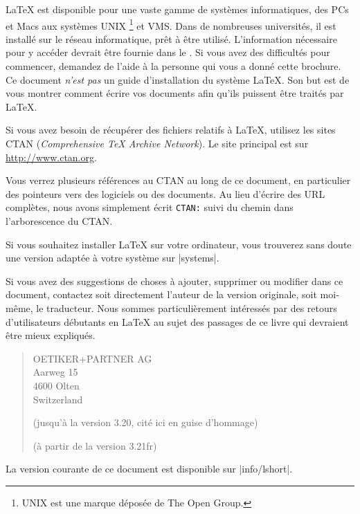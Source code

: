\bigskip
\noindent \LaTeX{} est disponible pour une vaste gamme de systèmes
informatiques, des PCs et Macs aux systèmes UNIX
\footnote{UNIX est une marque déposée de The Open Group.}
 et VMS. Dans de
nombreuses universités, il est installé sur le réseau informatique,
prêt à être utilisé. L'information nécessaire pour y accéder devrait
être fournie dans le \guide. Si vous avez des difficultés pour
commencer, demandez de l'aide à la personne qui vous a donné cette
brochure.  Ce document \emph{n'est pas} un guide d'installation du
système \LaTeX{}. Son but est de vous montrer comment écrire vos
documents afin qu'ils puissent être traités par \LaTeX{}.

\bigskip
{}
Si vous avez besoin de récupérer des fichiers relatifs à \LaTeX{},
utilisez les sites CTAN (\emph{Comprehensive
  \TeX{} Archive Network})\label{CTAN}.
Le site principal est sur \url{http://www.ctan.org}.

Vous verrez plusieurs références au CTAN au long de ce document, en
particulier des pointeurs vers des logiciels ou des documents. Au lieu
d'écrire des URL complètes, nous avons simplement écrit \texttt{CTAN:}
suivi du chemin dans l'arborescence du CTAN.

Si vous souhaitez installer \LaTeX{} sur votre ordinateur, vous
trouverez sans doute une version adaptée à votre système sur
\CTAN|systems|.

\noindent Si vous avez des suggestions de choses à
ajouter, supprimer ou modifier dans ce document, contactez soit
directement l'auteur de la version originale, soit moi-même, le
traducteur.  Nous sommes particulièrement intéressés par des retours
d'utilisateurs débutants en \LaTeX{} au sujet des passages de ce livre
qui devraient être mieux expliqués.


\bigskip
\begin{verse}
%
{OETIKER+PARTNER AG\\Aarweg 15\\4600 Olten\\Switzerland}

%
{(jusqu'à la version 3.20, cité ici en guise d'hommage)}


%
{(à partir de la version 3.21fr)}

\end{verse}
\noindent La version courante de ce document est disponible sur
\CTAN|info/lshort|.

\endinput

%


